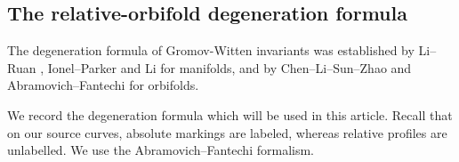 \documentclass[letterpaper,12pt]{amsart}
\theoremstyle{definition}
\newcommand{\cC}{\mathcal C}
\newcommand{\rel}{\mathrm{rel}}
\newcommand{\OrbCap}{\mathrm{Cap}}
\numberwithin{equation}{section}
\begin{document}



\subsection{The relative-orbifold degeneration formula}

The degeneration formula of Gromov-Witten invariants was established by Li--Ruan \cite{LR}, Ionel--Parker \cites{IPsum} and Li \cite{Jun2} for manifolds, and by  Chen--Li--Sun--Zhao
\cite{CLSZ} and
Abramovich--Fantechi \cite{AF} for orbifolds.  %

We record the degeneration formula which will be used in this article. Recall that on our source curves, absolute markings are labeled, whereas
relative profiles are unlabelled. We use the Abramovich--Fantechi formalism.
\end{document}
